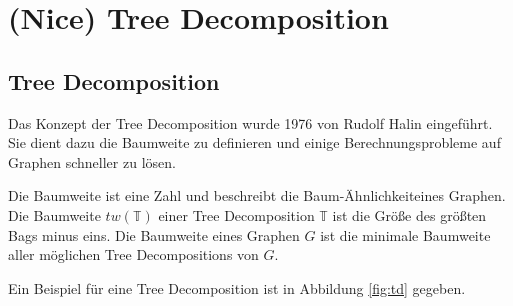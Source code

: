 %
%
%
\chapter{(Nice) Tree Decomposition}
\label{c:ntd} %

\section{Tree Decomposition}
\label{sec:ntd_td}

Das Konzept der Tree Decomposition wurde 1976 von Rudolf Halin\cite{Halin1976} eingeführt. Sie dient dazu die Baumweite zu definieren und einige Berechnungsprobleme auf Graphen schneller zu lösen.

Die Baumweite ist eine Zahl und beschreibt die \glqq Baum-Ähnlichkeit\grqq eines Graphen. Die Baumweite $tw(\mathbb{T})$ einer Tree Decomposition $\mathbb{T}$ ist die Größe des größten Bags minus eins. Die Baumweite eines Graphen $G$ ist die minimale Baumweite aller möglichen Tree Decompositions von $G$.

Ein Beispiel für eine Tree Decomposition ist in Abbildung \ref{fig:td} gegeben.

